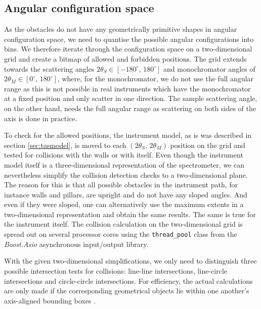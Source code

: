 \subsection{Angular configuration space}
As the obstacles do not have any geometrically primitive shapes in angular configuration space, we need to quantise
the possible angular configurations into bins. We therefore iterate through the configuration space on a two-dimensional 
grid and create a bitmap of allowed and forbidden positions. The grid extends towards the scattering angles 
$2\theta_S \in \left[ -180^{\circ},\, 180^{\circ} \right]$ and monochromator angles of 
$2\theta_M \in \left[0^{\circ},\, 180^{\circ} \right]$, where, for the monochromator, we do
not use the full angular range as this is not possible in real instruments which have the monochromator at a 
fixed position and only scatter in one direction. The sample scattering angle, on the other hand, needs the full 
angular range as scattering on both sides of the axis is done in practice.

To check for the allowed positions, the instrument model, as is was described in section \ref{sec:tasmodel}, is moved to
each $\left( 2\theta_S,\, 2\theta_M \right)$ position on the grid and tested for collisions with the walls or with
itself. Even though the instrument model itself is a three-dimensional representation of the spectrometer, we
can nevertheless simplify the collision detection checks to a two-dimensional plane. The reason for this is
that all possible obstacles in the instrument path, for instance walls and pillars, are upright and do not have
any sloped angles. And even if they were sloped, one can alternatively use the maximum extents in a two-dimensional 
representation and obtain the same results. The same is true for the instrument itself.
The collision calculation on the two-dimensional grid is spread out on several processor cores using the 
\lstinline[language=C++]|thread_pool| \cite{web_boost_asio_threadpool} class from the 
\textit{Boost.Asio} \cite{web_boost_asio} asynchronous input/output library.

With the given two-dimensional simplifications, we only need to distinguish three possible intersection tests for collisions: 
line-line intersections, line-circle intersections and circle-circle intersections. 
For efficiency, the actual calculations are only made if the corresponding geometrical objects lie within 
one another's axis-aligned bounding boxes \cite{web_aabb}.


